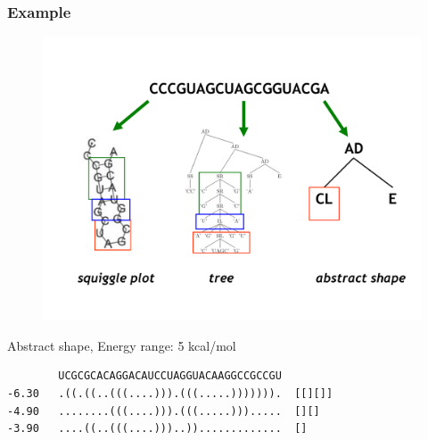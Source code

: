\documentclass[ignorenonframetext,10pt]{beamer}
\begin{document}


\begin{frame}
\frametitle{Example }
\begin{figure}
  \includegraphics[scale=0.4]{images/shrep_example.pdf} 
\end{figure}
\end{frame}


\begin{frame}[fragile]
  \begin{block}{\small Abstract shape, Energy range: 5 kcal/mol}
  \begin{verbatim}
        UCGCGCACAGGACAUCCUAGGUACAAGGCCGCCGU
-6.30   .((.((..(((....))).(((.....))))))).  [[][]]
-4.90   ........(((....))).(((.....))).....  [][]
-3.90   ....((..(((....)))..)).............  []
  \end{verbatim}
  \end{block}
\end{frame}
\end{document}
